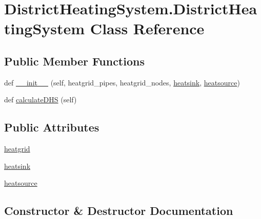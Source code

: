 \hypertarget{class_district_heating_system_1_1_district_heating_system}{}\section{District\+Heating\+System.\+District\+Heating\+System Class Reference}
\label{class_district_heating_system_1_1_district_heating_system}
\subsection*{Public Member Functions}
\begin{DoxyCompactItemize}
\item 
def \hyperlink{class_district_heating_system_1_1_district_heating_system_a46877fb13a3587e2c712079b2f5ff69c}{\+\_\+\+\_\+init\+\_\+\+\_\+} (self, heatgrid\+\_\+pipes, heatgrid\+\_\+nodes, \hyperlink{class_district_heating_system_1_1_district_heating_system_ae2dcd9798aea7a52e1940e4e95aa2d69}{heatsink}, \hyperlink{class_district_heating_system_1_1_district_heating_system_af223b084de1da27241485095b553c119}{heatsource})
\item 
def \hyperlink{class_district_heating_system_1_1_district_heating_system_a881f4f422912c1a2aba56fdf22394ad8}{calculate\+D\+HS} (self)
\end{DoxyCompactItemize}
\subsection*{Public Attributes}
\begin{DoxyCompactItemize}
\item 
\hyperlink{class_district_heating_system_1_1_district_heating_system_a60299959366e5b7bc682e8dc7f2c0aa9}{heatgrid}
\item 
\hyperlink{class_district_heating_system_1_1_district_heating_system_ae2dcd9798aea7a52e1940e4e95aa2d69}{heatsink}
\item 
\hyperlink{class_district_heating_system_1_1_district_heating_system_af223b084de1da27241485095b553c119}{heatsource}
\end{DoxyCompactItemize}


\subsection{Constructor \& Destructor Documentation}
\mbox{\label{class_district_heating_system_1_1_district_heating_system_a46877fb13a3587e2c712079b2f5ff69c}} 
